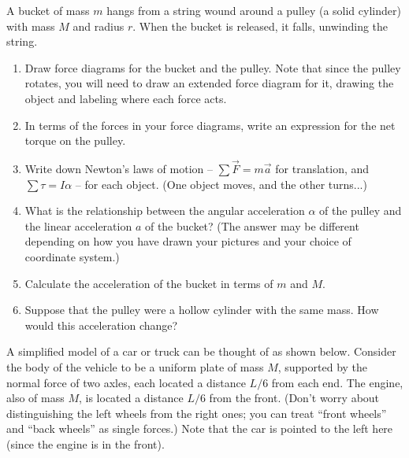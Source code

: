 \documentclass[12pt]{article}
\begin{document}
\Large
\centerline{}
\normalsize
\centerline{}


 A bucket of mass $m$ hangs from a string wound around a pulley 
(a solid cylinder) with mass $M$ and radius $r$. When the bucket is
released, it falls, unwinding the string.

\begin{enumerate}

\item Draw force diagrams for the bucket and the pulley. Note that since the pulley rotates, you will need
to draw an extended force diagram for it, drawing the object and labeling where each force acts.

\vspace{3in}

\item In terms of the forces in your force diagrams, write an expression for the net torque on the pulley.

\vspace{1in}

\item Write down Newton's laws of motion -- $\sum \vec F = m \vec a$ for translation, and $\sum \tau = I \alpha$
-- for each object. (One object moves, and the other turns...)

\vspace{2in}


\newpage

\item What is the relationship between the angular acceleration $\alpha$ of the pulley and the linear acceleration
$a$ of the bucket? (The answer may be different depending on how you have drawn your pictures and your choice of
coordinate system.)

\vspace{1in}

\item Calculate the acceleration of the bucket in terms of $m$ and $M$.

\vspace{4in}

\item Suppose that the pulley were a hollow cylinder with the same mass. How would this acceleration change?

\newpage
\end{enumerate}

A simplified model of a car or truck can be thought of as shown below. Consider
the body of the vehicle to be a uniform plate of mass $M$, supported by the
normal force of two axles, each located a distance $L/6$ from each end.
The engine, also of mass $M$, is located a distance $L/6$ from the front. (Don't worry about 
distinguishing the left wheels from the right ones; you can treat ``front wheels'' and ``back wheels''
as single forces.) Note that the car is pointed to the left here (since the engine is in the front).
\end{document}
